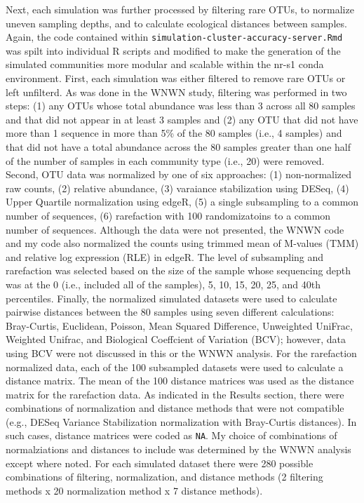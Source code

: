 \documentclass[
]{article}
\begin{document}
Next, each simulation was further processed by filtering rare OTUs, to
normalize uneven sampling depths, and to calculate ecological distances
between samples. Again, the code contained within
\texttt{simulation-cluster-accuracy-server.Rmd} was spilt into
individual R scripts and modified to make the generation of the
simulated communities more modular and scalable within the nr-s1 conda
environment. First, each simulation was either filtered to remove rare
OTUs or left unfilterd. As was done in the WNWN study, filtering was
performed in two steps: (1) any OTUs whose total abundance was less than
3 across all 80 samples and that did not appear in at least 3 samples
and (2) any OTU that did not have more than 1 sequence in more than 5\%
of the 80 samples (i.e., 4 samples) and that did not have a total
abundance across the 80 samples greater than one half of the number of
samples in each community type (i.e., 20) were removed. Second, OTU data
was normalized by one of six approaches: (1) non-normalized raw counts,
(2) relative abundance, (3) varaiance stabilization using DESeq, (4)
Upper Quartile normalization using edgeR, (5) a single subsampling to a
common number of sequences, (6) rarefaction with 100 randomizatoins to a
common number of sequences. Although the data were not presented, the
WNWN code and my code also normalized the counts using trimmed mean of
M-values (TMM) and relative log expression (RLE) in edgeR. The level of
subsampling and rarefaction was selected based on the size of the sample
whose sequencing depth was at the 0 (i.e., included all of the samples),
5, 10, 15, 20, 25, and 40th percentiles. Finally, the normalized
simulated datasets were used to calculate pairwise distances between the
80 samples using seven different calculations: Bray-Curtis, Euclidean,
Poisson, Mean Squared Difference, Unweighted UniFrac, Weighted Unifrac,
and Biological Coeffcient of Variation (BCV); however, data using BCV
were not discussed in this or the WNWN analysis. For the rarefaction
normalized data, each of the 100 subsampled datasets were used to
calculate a distance matrix. The mean of the 100 distance matrices was
used as the distance matrix for the rarefaction data. As indicated in
the Results section, there were combinations of normalization and
distance methods that were not compatible (e.g., DESeq Variance
Stabilization normalization with Bray-Curtis distances). In such cases,
distance matrices were coded as \texttt{NA}. My choice of combinations
of normalziations and distances to include was determined by the WNWN
analysis except where noted. For each simulated dataset there were 280
possible combinations of filtering, normalization, and distance methods
(2 filtering methods x 20 normalization method x 7 distance methods).
\end{document}
